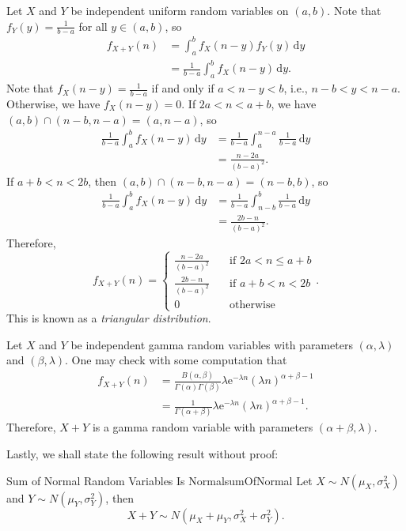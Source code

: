 \documentclass[math]{amznotes}
\theoremstyle{remark}
\newcommand{\0}{\mathbf{0}}
\newcommand{\1}{\mathbf{1}}
\newcommand{\e}{\mathrm{e}}
\begin{document}
Let $X$ and $Y$ be independent uniform random variables on $(a, b)$. Note that $f_Y(y) = \frac{1}{b - a}$ for all $y \in (a, b)$, so
\begin{align*}
    f_{X + Y}(n) & = \int_{a}^{b}\!f_X(n - y)f_Y(y)\,\mathrm{d}y \\
    & = \frac{1}{b - a}\int_{a}^{b}\!f_X(n - y)\,\mathrm{d}y.
\end{align*}
Note that $f_X(n - y) = \frac{1}{b - a}$ if and only if $a < n - y < b$, i.e., $n - b < y < n - a$. Otherwise, we have $f_X(n - y) = 0$. If $2a < n < a + b$, we have $(a, b) \cap (n - b, n - a) = (a, n - a)$, so
\begin{align*}
    \frac{1}{b - a}\int_{a}^{b}\!f_X(n - y)\,\mathrm{d}y & = \frac{1}{b - a}\int_{a}^{n - a}\!\frac{1}{b - a}\,\mathrm{d}y \\
    & = \frac{n - 2a}{(b - a)^2}.
\end{align*}
If $a + b < n < 2b$, then $(a, b) \cap (n - b, n - a) = (n - b, b)$, so
\begin{align*}
    \frac{1}{b - a}\int_{a}^{b}\!f_X(n - y)\,\mathrm{d}y & = \frac{1}{b - a}\int_{n - b}^{b}\!\frac{1}{b - a}\,\mathrm{d}y \\
    & = \frac{2b - n}{(b - a)^2}.
\end{align*}
Therefore,
\begin{equation*}
    f_{X + Y}(n) = \begin{cases}
        \frac{n - 2a}{(b - a)^2} & \quad\textrm{if } 2a < n \leq a + b \\
        \frac{2b - n}{(b - a)^2} & \quad\textrm{if } a + b < n < 2b \\
        0 & \quad\textrm{otherwise}
    \end{cases}.
\end{equation*}
This is known as a \textit{triangular distribution}.

Let $X$ and $Y$ be independent gamma random variables with parameters $(\alpha, \lambda)$ and $(\beta, \lambda)$. One may check with some computation that
\begin{align*}
    f_{X + Y}(n) & = \frac{B(\alpha, \beta)}{\Gamma(\alpha)\Gamma(\beta)}\lambda\e^{-\lambda n}(\lambda n)^{\alpha + \beta - 1} \\
    & = \frac{1}{\Gamma(\alpha + \beta)}\lambda\e^{-\lambda n}(\lambda n)^{\alpha + \beta - 1}.
\end{align*}
Therefore, $X + Y$ is a gamma random variable with parameters $(\alpha + \beta, \lambda)$.

Lastly, we shall state the following result without proof:
\begin{probox}{Sum of Normal Random Variables Is Normal}{sumOfNormal}
    Let $X \sim N\left(\mu_X, \sigma_X^2\right)$ and $Y \sim N\left(\mu_Y, \sigma_Y^2\right)$, then 
    \begin{equation*}
        X + Y \sim N\left(\mu_X + \mu_Y, \sigma_X^2 + \sigma_Y^2\right).
    \end{equation*}
\end{probox}
\end{document}

